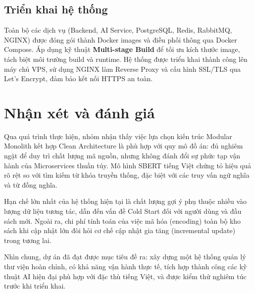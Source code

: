 \subsection{Triển khai hệ thống}

Toàn bộ các dịch vụ (Backend, AI Service, PostgreSQL, Redis, RabbitMQ, NGINX) được đóng gói thành Docker images và điều phối thông qua Docker Compose. Áp dụng kỹ thuật \textbf{Multi-stage Build} để tối ưu kích thước image, tách biệt môi trường build và runtime. Hệ thống được triển khai thành công lên máy chủ VPS, sử dụng NGINX làm Reverse Proxy và cấu hình SSL/TLS qua Let's Encrypt, đảm bảo kết nối HTTPS an toàn.

\section{Nhận xét và đánh giá}

Qua quá trình thực hiện, nhóm nhận thấy việc lựa chọn kiến trúc Modular Monolith kết hợp Clean Architecture là phù hợp với quy mô đồ án: đủ nghiêm ngặt để duy trì chất lượng mã nguồn, nhưng không đánh đổi sự phức tạp vận hành của Microservices thuần túy. Mô hình SBERT tiếng Việt chứng tỏ hiệu quả rõ rệt so với tìm kiếm từ khóa truyền thống, đặc biệt với các truy vấn ngữ nghĩa và từ đồng nghĩa.

Hạn chế lớn nhất của hệ thống hiện tại là chất lượng gợi ý phụ thuộc nhiều vào lượng dữ liệu tương tác, dẫn đến vấn đề Cold Start đối với người dùng và đầu sách mới. Ngoài ra, chi phí tính toán của việc mã hóa (encoding) toàn bộ kho sách khi cập nhật lớn đòi hỏi cơ chế cập nhật gia tăng (incremental update) trong tương lai.

Nhìn chung, dự án đã đạt được mục tiêu đề ra: xây dựng một hệ thống quản lý thư viện hoàn chỉnh, có khả năng vận hành thực tế, tích hợp thành công các kỹ thuật AI hiện đại phù hợp với đặc thù tiếng Việt, và được kiểm thử nghiêm túc trước khi triển khai.

